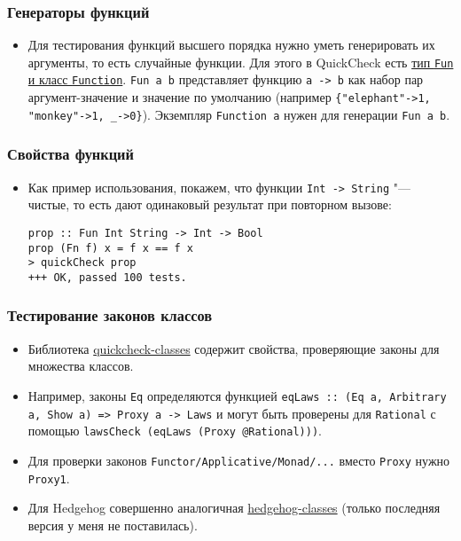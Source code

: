 \documentclass[11pt]{beamer}
\begin{document}
\begin{frame}[fragile]
\frametitle{Генераторы функций}
\begin{itemize}
    \item Для тестирования функций высшего порядка нужно уметь генерировать их аргументы, то есть случайные функции. Для этого в QuickCheck есть \href{http://hackage.haskell.org/package/QuickCheck-2.13.1/docs/Test-QuickCheck.html#g:14}{тип \lstinline|Fun| и класс \lstinline|Function|}. \lstinline|Fun a b| представляет функцию \lstinline|a -> b| как набор пар аргумент-значение и значение по умолчанию (например \lstinline|{"elephant"->1, "monkey"->1, _->0}|). Экземпляр \lstinline|Function a| нужен для генерации \lstinline|Fun a b|. 
\end{itemize}
\end{frame}

\begin{frame}[fragile]
\frametitle{Свойства функций}
\begin{itemize}
    \item Как пример использования, покажем, что функции \lstinline|Int -> String| "--- чистые, то есть дают одинаковый результат при повторном вызове:
\begin{lstlisting}
prop :: Fun Int String -> Int -> Bool
prop (Fn f) x = f x == f x
> quickCheck prop
+++ OK, passed 100 tests.
\end{lstlisting}
\end{itemize}
\end{frame}

\begin{frame}[fragile]
\frametitle{Тестирование законов классов}
\begin{itemize}
    \item Библиотека \href{http://hackage.haskell.org/package/quickcheck-classes}{quickcheck-classes} содержит свойства, проверяющие законы для множества классов.
    \item Например, законы \lstinline|Eq| определяются функцией \lstinline|eqLaws :: (Eq a, Arbitrary a, Show a) => Proxy a -> Laws| и могут быть проверены для \lstinline|Rational| с помощью \lstinline|lawsCheck (eqLaws (Proxy @Rational)))|.
    \item Для проверки законов \lstinline|Functor/Applicative/Monad/...| вместо \lstinline|Proxy| нужно \lstinline|Proxy1|.
    \item Для Hedgehog совершенно аналогичная \href{https://hackage.haskell.org/package/hedgehog-classes}{hedgehog-classes} (только последняя версия у меня не поставилась).
\end{itemize}
\end{frame}
\end{document}
